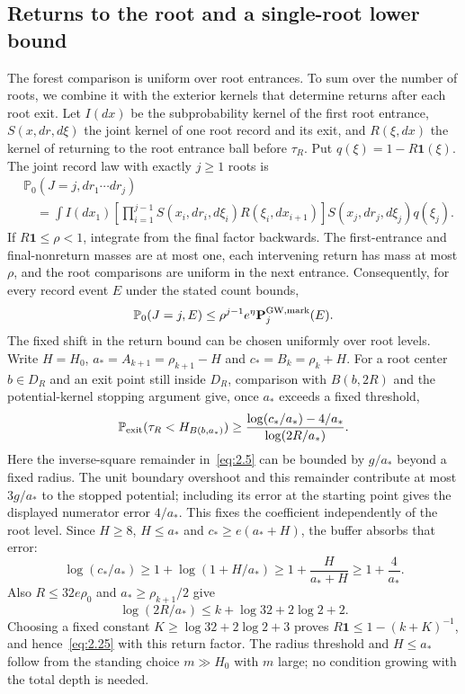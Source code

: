 \documentclass[11pt,letterpaper,reqno]{amsart}
\numberwithin{equation}{section}
\theoremstyle{remark}
\begin{document}
\subsection{Returns to the root and a single-root lower bound}\label{sec:roots}
The forest comparison is uniform over root entrances. To sum over the number of roots, we combine it with the exterior kernels that determine returns after each root exit. Let $I(dx)$ be the subprobability kernel of the first root entrance, $S(x,dr,d\xi)$ the joint kernel of one root record and its exit, and $R(\xi,dx)$ the kernel of returning to the root entrance ball before $\tau_R$. Put $q(\xi)=1-R\mathbf1(\xi)$. The joint record law with exactly $j\ge1$ roots is
\begin{equation}\label{eq:root-record-kernel}
\begin{split}
&\mathbb P_0(J=j,dr_1\cdots dr_j)\\
&\quad=\int I(dx_1)
\left[\prod_{i=1}^{j-1}S(x_i,dr_i,d\xi_i)R(\xi_i,dx_{i+1})\right]
S(x_j,dr_j,d\xi_j)q(\xi_j).
\end{split}
\end{equation}
If $R\mathbf1\le\rho<1$, integrate from the final factor backwards. The first-entrance and final-nonreturn masses are at most one, each intervening return has mass at most $\rho$, and the root comparisons are uniform in the next entrance. Consequently, for every record event $E$ under the stated count bounds,
\begin{equation}\label{eq:2.25}
\mathbb P_0(J=j,E)\le \rho^{j-1}e^\eta\mathbf P_j^{\rm GW,mark}(E).
\end{equation}
The fixed shift in the return bound can be chosen uniformly over root levels. Write $H=H_0$, $a_*=A_{k+1}=\rho_{k+1}-H$ and $c_*=B_k=\rho_k+H$. For a root center $b\in D_R$ and an exit point still inside $D_R$, comparison with $B(b,2R)$ and the potential-kernel stopping argument give, once $a_*$ exceeds a fixed threshold,
\[
\mathbb P_{\rm exit}(\tau_R<H_{B(b,a_*)})
\ge\frac{\log(c_*/a_*)-4/a_*}{\log(2R/a_*)}.
\]
Here the inverse-square remainder in~\eqref{eq:2.5} can be bounded by $g/a_*$ beyond a fixed radius. The unit boundary overshoot and this remainder contribute at most $3g/a_*$ to the stopped potential; including its error at the starting point gives the displayed numerator error $4/a_*$. This fixes the coefficient independently of the root level.
Since $H\ge8$, $H\le a_*$ and $c_*\ge e(a_*+H)$, the buffer absorbs that error:
\[
\log(c_*/a_*)\ge1+\log(1+H/a_*)
\ge1+\frac{H}{a_*+H}\ge1+\frac4{a_*}.
\]
Also $R\le32e\rho_0$ and $a_*\ge\rho_{k+1}/2$ give
\[
\log(2R/a_*)\le k+\log32+2\log2+2.
\]
Choosing a fixed constant $K\ge\log32+2\log2+3$ proves $R\mathbf1\le1-(k+K)^{-1}$, and hence~\eqref{eq:2.25} with this return factor. The radius threshold and $H\le a_*$ follow from the standing choice $m\gg H_0$ with $m$ large; no condition growing with the total depth is needed.
\end{document}
